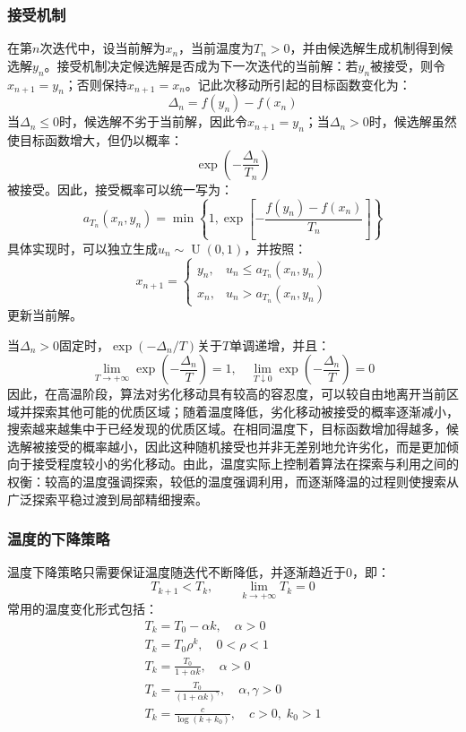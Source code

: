\subsubsection{接受机制}
在第$n$次迭代中，设当前解为$x_n$，当前温度为$T_n>0$，并由候选解生成机制得到候选解$y_n$。接受机制决定候选解是否成为下一次迭代的当前解：若$y_n$被接受，则令$x_{n+1}=y_n$；否则保持$x_{n+1}=x_n$。记此次移动所引起的目标函数变化为：
\begin{equation*}
	\Delta_n=f(y_n)-f(x_n)
\end{equation*}
当$\Delta_n\leqslant0$时，候选解不劣于当前解，因此令$x_{n+1}=y_n$；当$\Delta_n>0$时，候选解虽然使目标函数增大，但仍以概率：
\begin{equation*}
	\exp\left(-\frac{\Delta_n}{T_n}\right)
\end{equation*}
被接受。因此，接受概率可以统一写为：
\begin{equation*}
	a_{T_n}(x_n,y_n)=\min\left\{1,\exp\left[-\frac{f(y_n)-f(x_n)}{T_n}\right]\right\}
\end{equation*}
具体实现时，可以独立生成$u_n\sim\operatorname{U}(0,1)$，并按照：
\begin{equation*}
	x_{n+1}=
	\begin{cases}
		y_n,&u_n\leqslant a_{T_n}(x_n,y_n) \\
		x_n,&u_n>a_{T_n}(x_n,y_n)
	\end{cases}
\end{equation*}
更新当前解。\par
当$\Delta_n>0$固定时，$\exp(-\Delta_n/T)$关于$T$单调递增，并且：
\begin{equation*}
	\lim_{T\to+\infty}\exp\left(-\frac{\Delta_n}{T}\right)=1,\quad\lim_{T\downarrow0}\exp\left(-\frac{\Delta_n}{T}\right)=0
\end{equation*}
因此，在高温阶段，算法对劣化移动具有较高的容忍度，可以较自由地离开当前区域并探索其他可能的优质区域；随着温度降低，劣化移动被接受的概率逐渐减小，搜索越来越集中于已经发现的优质区域。在相同温度下，目标函数增加得越多，候选解被接受的概率越小，因此这种随机接受也并非无差别地允许劣化，而是更加倾向于接受程度较小的劣化移动。由此，温度实际上控制着算法在探索与利用之间的权衡：较高的温度强调探索，较低的温度强调利用，而逐渐降温的过程则使搜索从广泛探索平稳过渡到局部精细搜索。
\subsubsection{温度的下降策略}
温度下降策略只需要保证温度随迭代不断降低，并逐渐趋近于$0$，即：
\begin{equation*}
	T_{k+1}<T_k,\qquad \lim_{k\to+\infty}T_k=0
\end{equation*}
常用的温度变化形式包括：
\begin{gather*}
	T_k=T_0-\alpha k,\quad\alpha>0 \\
	T_k=T_0\rho^k,\quad0<\rho<1 \\
	T_k=\frac{T_0}{1+\alpha k},\quad\alpha>0 \\
	T_k=\frac{T_0}{(1+\alpha k)^\gamma},\quad\alpha,\gamma>0 \\
	T_k=\frac{c}{\log(k+k_0)},\quad c>0,\;k_0>1
\end{gather*}
